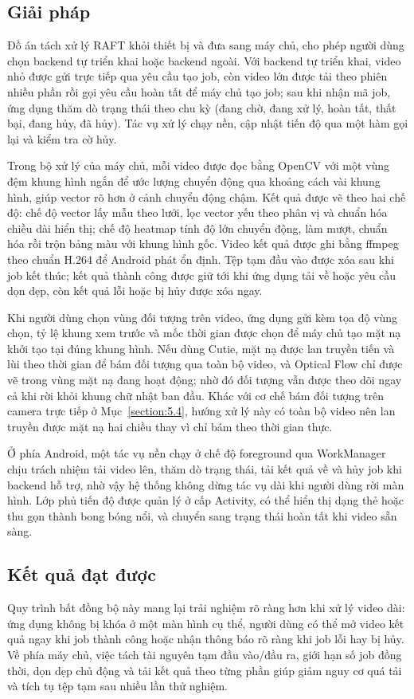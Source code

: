 \documentclass[../DoAn.tex]{subfiles}
\begin{document}
\subsection{Giải pháp}
Đồ án tách xử lý RAFT khỏi thiết bị và đưa sang máy chủ, cho phép người dùng chọn backend tự triển khai hoặc backend ngoài. Với backend tự triển khai, video nhỏ được gửi trực tiếp qua yêu cầu tạo job, còn video lớn được tải theo phiên nhiều phần rồi gọi yêu cầu hoàn tất để máy chủ tạo job; sau khi nhận mã job, ứng dụng thăm dò trạng thái theo chu kỳ (đang chờ, đang xử lý, hoàn tất, thất bại, đang hủy, đã hủy). Tác vụ xử lý chạy nền, cập nhật tiến độ qua một hàm gọi lại và kiểm tra cờ hủy.

Trong bộ xử lý của máy chủ, mỗi video được đọc bằng OpenCV với một vùng đệm khung hình ngắn để ước lượng chuyển động qua khoảng cách vài khung hình, giúp vector rõ hơn ở cảnh chuyển động chậm. Kết quả được vẽ theo hai chế độ: chế độ vector lấy mẫu theo lưới, lọc vector yếu theo phân vị và chuẩn hóa chiều dài hiển thị; chế độ heatmap tính độ lớn chuyển động, làm mượt, chuẩn hóa rồi trộn bảng màu với khung hình gốc. Video kết quả được ghi bằng ffmpeg theo chuẩn H.264 để Android phát ổn định. Tệp tạm đầu vào được xóa sau khi job kết thúc; kết quả thành công được giữ tới khi ứng dụng tải về hoặc yêu cầu dọn dẹp, còn kết quả lỗi hoặc bị hủy được xóa ngay.

Khi người dùng chọn vùng đối tượng trên video, ứng dụng gửi kèm tọa độ vùng chọn, tỷ lệ khung xem trước và mốc thời gian được chọn để máy chủ tạo mặt nạ khởi tạo tại đúng khung hình. Nếu dùng Cutie, mặt nạ được lan truyền tiến và lùi theo thời gian để bám đối tượng qua toàn bộ video, và Optical Flow chỉ được vẽ trong vùng mặt nạ đang hoạt động; nhờ đó đối tượng vẫn được theo dõi ngay cả khi rời khỏi khung chữ nhật ban đầu. Khác với cơ chế bám đối tượng trên camera trực tiếp ở Mục~\ref{section:5.4}, hướng xử lý này có toàn bộ video nên lan truyền được mặt nạ hai chiều thay vì chỉ bám theo thời gian thực.

Ở phía Android, một tác vụ nền chạy ở chế độ foreground qua WorkManager chịu trách nhiệm tải video lên, thăm dò trạng thái, tải kết quả về và hủy job khi backend hỗ trợ, nhờ vậy hệ thống không dừng tác vụ dài khi người dùng rời màn hình. Lớp phủ tiến độ được quản lý ở cấp Activity, có thể hiển thị dạng thẻ hoặc thu gọn thành bong bóng nổi, và chuyển sang trạng thái hoàn tất khi video sẵn sàng.

\subsection{Kết quả đạt được}
Quy trình bất đồng bộ này mang lại trải nghiệm rõ ràng hơn khi xử lý video dài: ứng dụng không bị khóa ở một màn hình cụ thể, người dùng có thể mở video kết quả ngay khi job thành công hoặc nhận thông báo rõ ràng khi job lỗi hay bị hủy. Về phía máy chủ, việc tách tài nguyên tạm đầu vào/đầu ra, giới hạn số job đồng thời, dọn dẹp chủ động và tải kết quả theo từng phần giúp giảm nguy cơ quá tải và tích tụ tệp tạm sau nhiều lần thử nghiệm.
\end{document}
